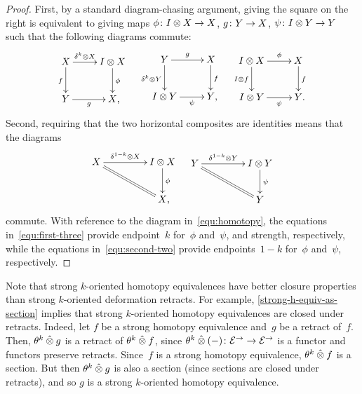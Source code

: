 \documentclass[reqno,10pt,a4paper,oneside,draft]{amsart}
\begin{document}
{{\begin{proof}
First, by a standard diagram-chasing argument, giving the square on the right is equivalent to giving maps $\phi \colon I \otimes X \to X$, $g \colon Y \to X$, $\psi \colon I \otimes Y \to Y$ such that the following diagrams commute:
\begin{align} \label{equ:first-three}
\begin{gathered}
\xymatrix{
  X
  \ar[r]^-{\kcyl \otimes X}
  \ar[d]_f
&
  \interval \otimes X
  \ar[d]^{\phi}
\\
  Y \ar[r]_-{g}
&
  X
\rlap{,}}
\end{gathered}
&&
\begin{gathered}
\xymatrix{
  Y
  \ar[r]^-g
  \ar[d]_{\kcyl \otimes Y}
&
  X
  \ar[d]^f
\\
  \interval \otimes Y
  \ar[r]_-{\psi}
&
  Y
\rlap{,}}
\end{gathered}
&&
\begin{gathered}
\xymatrix{
  \interval \otimes X
  \ar[r]^-\phi
  \ar[d]_{I \otimes f}
&
  X
  \ar[d]^{f}
\\
  \interval \otimes Y
  \ar[r]_-{\psi}
&
  Y
\rlap{.}}
\end{gathered}
\end{align}
Second, requiring that the two horizontal composites are identities means that the diagrams
\begin{align} \label{equ:second-two}
\begin{gathered}
\xymatrix@C+2em{
  X
  \ar[r]^-{\kcylinv \otimes X}
  \ar@{=}[dr]
&
  \interval \otimes X
  \ar[d]^\phi
\\&
  X
\rlap{,}}
\end{gathered}
&&
\begin{gathered}
\xymatrix@C+2em{
  Y
  \ar[r]^-{\kcylinv \otimes Y}
  \ar@{=}[dr]
&
  \interval \otimes Y
  \ar[d]^{\psi}
\\&
  Y
}
\end{gathered}
\end{align}
commute.
With reference to the diagram in~\eqref{equ:homotopy}, the equations in~\eqref{equ:first-three} provide endpoint~$k$ for~$\phi$ and~$\psi$, and strength, respectively, while the equations in~\eqref{equ:second-two} provide endpoints~$1-k$ for~$\phi$ and~$\psi$, respectively.
\end{proof}



Note that strong $k$-oriented homotopy equivalences have better closure properties than strong $k$-oriented deformation retracts.
For example, \cref{strong-h-equiv-as-section} implies that strong $k$-oriented homotopy equivalences are closed under retracts.
Indeed, let $f$ be a strong homotopy equivalence and~$g$ be a retract of~$f$.
Then, $\theta^k \mathbin{\hat{\otimes}} g$ is a retract of $\theta^k \mathbin{\hat{\otimes}} f$, since $\theta^k \mathbin{\hat{\otimes}} (-) \colon \mathcal{E}^\to \to \mathcal{E}^\to$ is a functor and functors preserve retracts.
Since~$f$ is a strong homotopy equivalence, $\theta^k \mathbin{\hat{\otimes}} f$ is a section.
But then $\theta^k \mathbin{\hat{\otimes}} g$ is also a section (since sections are closed under retracts), and so $g$ is a strong $k$-oriented homotopy equivalence.

}}
\end{document}
